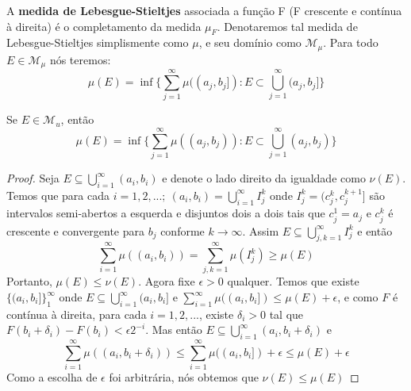 \begin{definicao}
    A \textbf{medida de Lebesgue-Stieltjes} associada a função F (F crescente e contínua à direita) é o completamento da medida $\mu_F$. Denotaremos tal medida de Lebesgue-Stieltjes simplismente como $\mu$, e seu domínio como $ \mathcal{M}_\mu$. Para todo $E \in \mathcal{M}_{\mu}$ nós teremos:
    \[
        \mu(E)=\inf \bigg\{ \sum _{j=1}^{\infty} \mu((a_j,b_j]) : E \subset \bigcup _{j=1} ^\infty (a_j,b_j] \bigg\}        
    \]
\end{definicao}

\begin{lema}\label{lema3.1}
    Se $E \in \mathcal{M}_u$, então
    \[
    \mu(E)=\inf \bigg\{ \sum _{j=1}^{\infty} \mu((a_j,b_j)) : E \subset \bigcup _{j=1} ^\infty (a_j,b_j) \bigg\}    
    \]

    \begin{proof}
        Seja $E \subseteq \bigcup_{i=1}^\infty (a_i,b_i)$ e denote o lado direito da igualdade como $\nu(E)$. Temos que para cada $i=1,2,...; \ (a_i,b_i) = \bigcup_{i=1}^\infty I_j ^k$ onde $I_j ^k=(c_j ^k,c_j ^{k+1}]$ são intervalos semi-abertos a esquerda e disjuntos dois a dois tais que $c_j ^1 = a_j$ e $c_j ^k$ é crescente e convergente para $b_j$ conforme $k \to \infty$. Assim $E \subseteq \bigcup_{j,k=1}^\infty I_{j}^k$ e então 
        \[
        \sum_{i=1}^\infty \mu((a_i,b_i))=\sum_{j,k=1} ^\infty \mu(I_j ^k) \geq \mu(E)   
        \]
        Portanto, $\mu(E) \leq \nu(E)$. Agora fixe $\epsilon > 0$ qualquer. Temos que existe $\{(a_i,b_i]\}_1 ^\infty$ onde $E \subseteq \bigcup_{i=1}^\infty (a_i,b_i]$ e $\sum_{i=1}^\infty \mu ((a_i,b_i]) \leq \mu(E) + \epsilon$, e como $F$ é contínua à direita, para cada $i=1,2,...$, existe $\delta_i > 0$ tal que $F(b_i + \delta_i)-F(b_i) < \epsilon 2^{-i}$. Mas então $E \subseteq \bigcup _{i=1}^\infty (a_i,b_i+\delta_i)$ e 
        \[
        \sum_{i=1}^\infty \mu((a_i,b_i+\delta_i))  \leq \sum_{i=1}^\infty \mu((a_i,b_i]) + \epsilon \leq \mu(E) + \epsilon    
        \]
        Como a escolha de $\epsilon$ foi arbitrária, nós obtemos que $\nu(E) \leq \mu(E)$
    \end{proof}


\end{lema}

